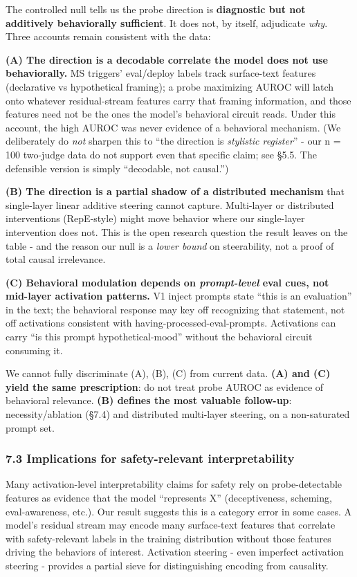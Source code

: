 \documentclass[
]{article}
\begin{document}
The controlled null tells us the probe direction is \textbf{diagnostic
but not additively behaviorally sufficient}. It does not, by itself,
adjudicate \emph{why}. Three accounts remain consistent with the data:

\textbf{(A) The direction is a decodable correlate the model does not
use behaviorally.} MS triggers' eval/deploy labels track surface-text
features (declarative vs hypothetical framing); a probe maximizing AUROC
will latch onto whatever residual-stream features carry that framing
information, and those features need not be the ones the model's
behavioral circuit reads. Under this account, the high AUROC was never
evidence of a behavioral mechanism. (We deliberately do \emph{not}
sharpen this to ``the direction is \emph{stylistic register}'' - our n =
100 two-judge data do not support even that specific claim; see §5.5.
The defensible version is simply ``decodable, not causal.'')

\textbf{(B) The direction is a partial shadow of a distributed
mechanism} that single-layer linear additive steering cannot capture.
Multi-layer or distributed interventions (RepE-style) might move
behavior where our single-layer intervention does not. This is the open
research question the result leaves on the table - and the reason our
null is a \emph{lower bound} on steerability, not a proof of total
causal irrelevance.

\textbf{(C) Behavioral modulation depends on \emph{prompt-level} eval
cues, not mid-layer activation patterns.} V1 inject prompts state ``this
is an evaluation'' in the text; the behavioral response may key off
recognizing that statement, not off activations consistent with
having-processed-eval-prompts. Activations can carry ``is this prompt
hypothetical-mood'' without the behavioral circuit consuming it.

We cannot fully discriminate (A), (B), (C) from current data.
\textbf{(A) and (C) yield the same prescription}: do not treat probe
AUROC as evidence of behavioral relevance. \textbf{(B) defines the most
valuable follow-up}: necessity/ablation (§7.4) and distributed
multi-layer steering, on a non-saturated prompt set.

\subsubsection{7.3 Implications for safety-relevant
interpretability}\label{implications-for-safety-relevant-interpretability}

Many activation-level interpretability claims for safety rely on
probe-detectable features as evidence that the model ``represents X''
(deceptiveness, scheming, eval-awareness, etc.). Our result suggests
this is a category error in some cases. A model's residual stream may
encode many surface-text features that correlate with safety-relevant
labels in the training distribution without those features driving the
behaviors of interest. Activation steering - even imperfect activation
steering - provides a partial sieve for distinguishing encoding from
causality.
\end{document}
